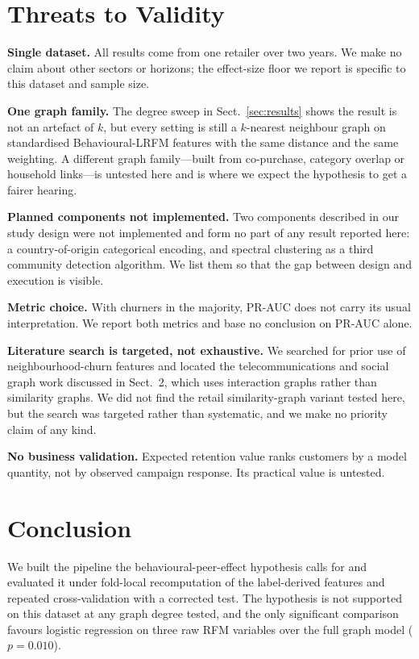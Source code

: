 \documentclass[runningheads]{llncs}
\begin{document}
\section{Threats to Validity}

\textbf{Single dataset.} All results come from one retailer over two years. We
make no claim about other sectors or horizons; the effect-size floor we report is
specific to this dataset and sample size.

\textbf{One graph family.} The degree sweep in Sect.~\ref{sec:results} shows the
result is not an artefact of $k$, but every setting is still a $k$-nearest
neighbour graph on standardised Behavioural-LRFM features with the same distance
and the same weighting. A different graph family---built from co-purchase,
category overlap or household links---is untested here and is where we expect the
hypothesis to get a fairer hearing.

\textbf{Planned components not implemented.} Two components described in our
study design were not implemented and form no part of any result reported here: a
country-of-origin categorical encoding, and spectral clustering as a third
community detection algorithm. We list them so that the gap between design and
execution is visible.

\textbf{Metric choice.} With churners in the majority, PR-AUC does not carry its
usual interpretation. We report both metrics and base no conclusion on PR-AUC
alone.

\textbf{Literature search is targeted, not exhaustive.} We searched for prior use
of neighbourhood-churn features and located the telecommunications and social
graph work discussed in Sect.~2, which uses interaction graphs rather than
similarity graphs. We did not find the retail similarity-graph variant tested
here, but the search was targeted rather than systematic, and we make no priority
claim of any kind.

\textbf{No business validation.} Expected retention value ranks customers by a
model quantity, not by observed campaign response. Its practical value is
untested.

\section{Conclusion}

We built the pipeline the behavioural-peer-effect hypothesis calls for and
evaluated it under fold-local recomputation of the label-derived features and
repeated cross-validation with a corrected test. The hypothesis is not supported
on this dataset at any graph degree tested, and the only significant comparison
favours logistic regression on three raw RFM variables over the full graph model
($p = 0.010$).
\end{document}

